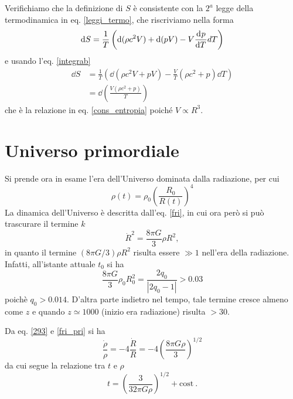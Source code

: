 Verifichiamo che la definizione di $S$ è consistente con la $2^a$ legge della
termodinamica in eq. \eqref{leggi_termo}, che riscriviamo nella forma
\begin{equation}
  \mathop{}\!\mathrm{d} S  = \frac{1}{T} \left( \mathop{}\!\mathrm{d}(\rho c^2 V) + \mathop{}\!\mathrm{d}(pV) - V \frac{{\mathop{}\!\mathrm{d}^{}}p}{\mathop{}\!\mathrm{d} {T}^{}} dT
  \right)
\end{equation}
e usando l'eq. \eqref{integrab}
\begin{equation}
  \begin{split}
    \dd S &= \frac{1}{T} \left( \dd(\rho c^2 V + pV) -  \frac{V}{T}   (\rho c^2
      +p) \dd T \right) \\
    &= \dd\left( \frac{V (\rho c^2 + p)} {T}  \right)
  \end{split}
\end{equation}
che è la relazione in eq. \eqref{cons_entropia} poiché $V \propto R^3$.

\section{Universo primordiale}

Si prende ora in esame l'era dell'Universo dominata dalla radiazione, per cui
\begin{equation}
  \rho(t)=\rho_0 \left(\frac{R_0}{R(t)} \right)^4
  \label{293}
\end{equation}
La dinamica dell'Universo è descritta dall'eq. \eqref{fri}, in cui ora però si
può trascurare il termine $k$
\begin{equation}
  \dot{R}^2 = \frac{8 \pi G}{3} \rho R^2,
  \label{fri_pri}
\end{equation}
in quanto il termine $(8 \pi G /3) \rho R^2$ risulta essere $\gg 1$ nell'era
della radiazione.  Infatti, all'istante attuale $t_0$ si ha
\begin{equation}
  \frac{8 \pi G}{3} \rho_0 R^2_0 = \frac{2q_0}{|2q_0-1|} > 0.03
\end{equation}
poichè $q_0>0.014$.  D'altra parte indietro nel tempo, tale termine cresce
almeno come $z$ e quando $z\simeq 1000$ (inizio era radiazione) risulta $>30$.

Da eq. \eqref{293} e \eqref{fri_pri} si ha
\begin{equation}
  \frac{\dot \rho}{\rho} = -4 \frac{\dot R}{R} = - 4 \left( \frac{8 \pi G
      \rho}{3} \right)^{1/2}
\end{equation}
da cui segue la relazione tra $t$ e $\rho$
\begin{equation}
  t = \left( \frac{3}{32 \pi G \rho} \right)^{1/2} + \text{cost}\ .
  \label{tvsrho}
\end{equation}

